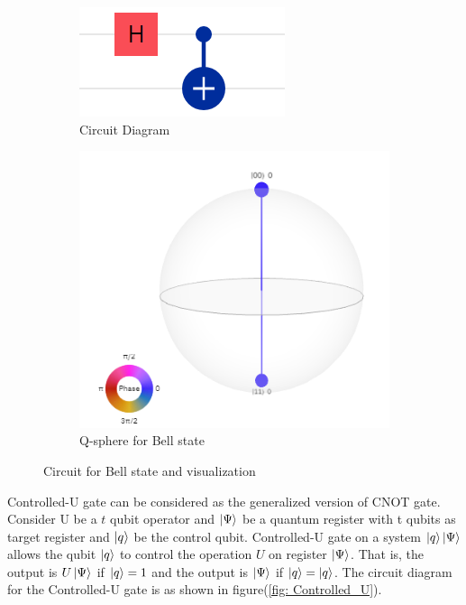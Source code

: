 \begin{figure}[H]
  \centering
  \begin{subfigure}[b]{0.3\linewidth}
    \includegraphics[width=\linewidth]{figures/bellstatecircuit.PNG}
    \caption{Circuit Diagram}
  \end{subfigure}
  \begin{subfigure}[b]{0.3\linewidth}
    \includegraphics[width=\linewidth]{figures/bellstateqsphere.PNG}
    \caption{Q-sphere for Bell state}
  \end{subfigure}
  \caption{Circuit for Bell state and visualization}
  \label{fig: bellstate_plus_circuit}
\end{figure}

Controlled-U gate can be considered as the generalized version of CNOT gate.\cite{Cheung} Consider U be a $t$ qubit operator and $\ket{\Psi}$ be a quantum register with t qubits as target register and $\ket{q}$ be the control qubit. Controlled-U gate on a system $\ket{q} \ket{\Psi}$ allows the qubit $\ket{q}$ to control the operation $U$ on register $\ket{\Psi}$. That is, the output is $U\ket{\Psi}$ if $\ket{q} = 1$ and the output is $\ket{\Psi}$ if $\ket{q} = \ket{q}$. The circuit diagram for the Controlled-U gate is as shown in figure(\ref{fig: Controlled_U}). 

